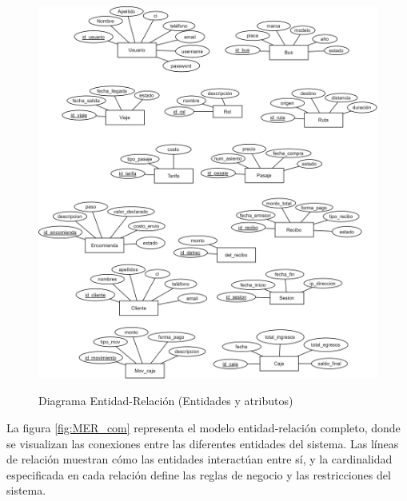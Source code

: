 	\begin{figure}[!h] %
		\caption[Diagrama Entidad-Relación ]
		{\newline Diagrama Entidad-Relación (Entidades y atributos)} %
		\vspace{0.3cm}
		\centering
		\includegraphics[width=1\textwidth]{imagenes/cap_3/MER_ent_atri.png} %
		\vspace{0.3cm}
		\vspace{-0.8cm}
		\label{fig:ent_atri} %
	\end{figure}
	
	La figura \ref{fig:MER_com} representa el modelo entidad-relación completo, donde se visualizan las conexiones entre las diferentes entidades del sistema. Las líneas de relación muestran cómo las entidades interactúan entre sí, y la cardinalidad especificada en cada relación define las reglas de negocio y las restricciones del sistema.
	
